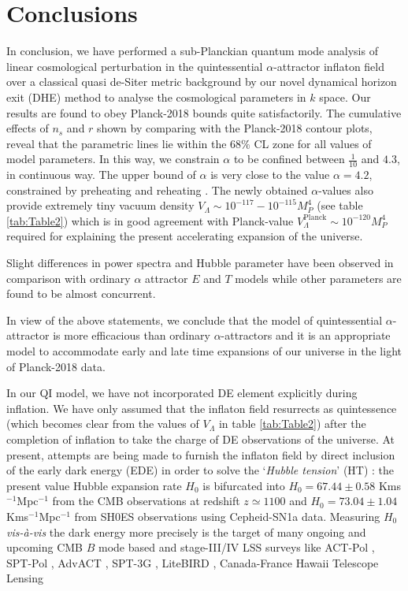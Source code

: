 \documentclass[a4paper,11pt]{article}
\begin{document}
\section{Conclusions}
\label{sec:conclusion}
In conclusion, we have performed a sub-Planckian quantum mode analysis of linear cosmological perturbation in the quintessential $\alpha$-attractor inflaton field over a classical quasi de-Siter metric background by our novel dynamical horizon exit (DHE) method to analyse the cosmological parameters in $k$ space. Our results are found to obey Planck-2018 bounds quite satisfactorily. The cumulative effects of $n_s$ and $r$ shown by comparing with the Planck-2018 contour plots, reveal that the parametric lines lie within the $68\%$ CL zone for all values of model parameters. In this way, we constrain $\alpha$ to be confined between $\frac{1}{10}$ and $4.3$, in continuous way. The upper bound of $\alpha$ is very close to the value $\alpha=4.2$, constrained by preheating and reheating \cite{Dimopoulos:2017tud}. The newly obtained $\alpha$-values also provide extremely tiny vacuum density $V_{\Lambda}\sim 10^{-117}-10^{-115} M_P^4$ (see table \ref{tab:Table2}) which is in good agreement with Planck-value $V_{\Lambda}^{\mathrm{Planck}}\sim 10^{-120} M_P^4$ required for explaining the present accelerating expansion of the universe.\par Slight differences in power spectra and Hubble parameter have been observed in comparison with ordinary $\alpha$ attractor $E$ and $T$ models while other parameters are found to be almost concurrent.\par In view of the above statements, we conclude that the model of quintessential $\alpha$-attractor is more efficacious than ordinary $\alpha$-attractors and it is an appropriate model to accommodate early and late time expansions of our universe in the light of Planck-2018 data.\par In our QI model, we have not incorporated DE element explicitly during inflation. We have only assumed that the inflaton field resurrects as quintessence (which becomes clear from the values of $V_{\Lambda}$ in table \ref{tab:Table2}) after the completion of inflation to take the charge of DE observations of the universe. At present, attempts are being made to furnish the inflaton field by direct inclusion of the early dark energy (EDE) \cite{Brissenden:2023yko,Cruz:2023cxy,CarrilloGonzalez:2023lma,Reboucas:2023rjm,Poulin:2023lkg,Goldstein:2023gnw} in order to solve the `\textit{Hubble tension}' (HT) \cite{DiValentino:2021izs,Ben-Dayan:2023rgt}: the present value Hubble expansion rate $H_0$ is bifurcated into $H_0 = 67.44\pm 0.58$ Kms$^{-1}$Mpc$^{-1}$ from the CMB observations at redshift $z\simeq 1100$ \cite{Planck:2018vyg} and $H_0 = 73.04\pm 1.04$ Kms$^{-1}$Mpc$^{-1}$ from SH0ES observations \cite{Riess:2021jrx} using Cepheid-SN1a data. Measuring $H_0$ \textit{vis-\`{a}-vis} the dark energy more precisely is the target of many ongoing and upcoming CMB $B$ mode based and stage-III/IV LSS surveys like ACT-Pol \cite{ACTPol:2014pbf}, SPT-Pol \cite{SPT:2015htm}, AdvACT \cite{Henderson:2015nzj}, SPT-3G \cite{SPT-3G:2014dbx}, LiteBIRD \cite{LiteBIRD:2020khw}, Canada-France Hawaii Telescope Lensing 
\end{document}
